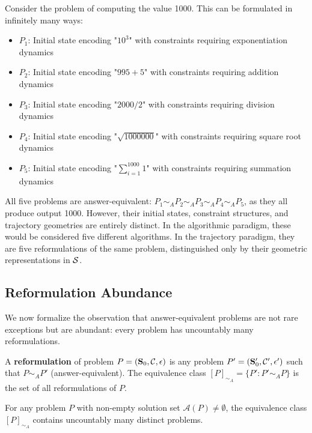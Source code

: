 \begin{example}
\label{ex:arithmetic}
Consider the problem of computing the value 1000. This can be formulated in infinitely many ways:
\begin{itemize}
    \item $P_1$: Initial state encoding "$10^3$" with constraints requiring exponentiation dynamics
    \item $P_2$: Initial state encoding "$995 + 5$" with constraints requiring addition dynamics
    \item $P_3$: Initial state encoding "$2000 / 2$" with constraints requiring division dynamics
    \item $P_4$: Initial state encoding "$\sqrt{1000000}$" with constraints requiring square root dynamics
    \item $P_5$: Initial state encoding "$\sum_{i=1}^{1000} 1$" with constraints requiring summation dynamics
\end{itemize}

All five problems are answer-equivalent: $P_1 \sim_A P_2 \sim_A P_3 \sim_A P_4 \sim_A P_5$, as they all produce output 1000. However, their initial states, constraint structures, and trajectory geometries are entirely distinct. In the algorithmic paradigm, these would be considered five different algorithms. In the trajectory paradigm, they are five reformulations of the same problem, distinguished only by their geometric representations in $\mathcal{S}$.
\end{example}

\subsection{Reformulation Abundance}

We now formalize the observation that answer-equivalent problems are not rare exceptions but are abundant: every problem has uncountably many reformulations.

\begin{definition}
\label{def:reformulation}
A \textbf{reformulation} of problem $P = (\mathbf{S}_0, \mathcal{C}, \epsilon)$ is any problem $P' = (\mathbf{S}_0', \mathcal{C}', \epsilon')$ such that $P \sim_A P'$ (answer-equivalent). The equivalence class $[P]_{\sim_A} = \{P' : P' \sim_A P\}$ is the set of all reformulations of $P$.
\end{definition}

\begin{theorem}
\label{thm:reformulation_abundance}
For any problem $P$ with non-empty solution set $\mathcal{A}(P) \neq \emptyset$, the equivalence class $[P]_{\sim_A}$ contains uncountably many distinct problems.
\end{theorem}

